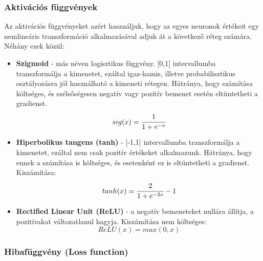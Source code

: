 \subsubsection{Aktivációs függvények}

Az aktivációs függvényeket azért használjuk, hogy az egyes neuronok értékeit egy nemlineáris transzformáció alkalmazásával adjuk át a következő réteg számára. Néhány ezek közül:
\begin{itemize}
 \item \textbf{Szigmoid} - más néven logisztikus függvény. [0,1] intervallumba transzformálja a kimenetet, ezáltal igaz-hamis, illetve probabilisztikus osztályozásra jól használható a kimeneti rétegen. Hátránya, hogy számítása költséges, és szélsőségesen negatív vagy pozitív bemenet esetén eltüntetheti a gradienst.
\begin{equation}
	sig(x) = \cfrac{1}{1+e^{-x}}
\end{equation}
 \item \textbf{Hiperbolikus tangens (tanh)} - [-1,1] intervallumba transzformálja a kimenetet, ezáltal nem csak pozitív értékeket alkalmazunk. Hátránya, hogy ennek a számítása is költséges, és esetenként ez is eltüntetheti a gradienst. Kiszámítása:
\begin{equation}
	tanh(x) = \cfrac{2}{1+e^{-2x}} - 1
\end{equation}
 \item \textbf{Rectified Linear Unit (ReLU)} - a negatív bemeneteket nullára állítja, a pozitívakat változatlanul hagyja. Kiszámítása nem költséges: \cite{deeplearningbook}
\begin{equation}
	ReLU(x) = max(0, x)
\end{equation}
 \end{itemize}

\subsubsection{Hibafüggvény (Loss function)}


